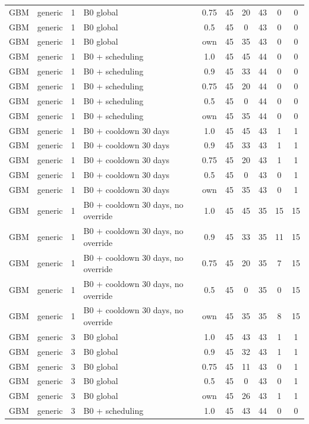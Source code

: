 \documentclass[10pt,onecolumn,letterpaper]{article}
\begin{document}
\begin{longtable}{lllp{4.4cm}cccccc}
GBM & generic & 1 & B0 global & 0.75 & 45 & 20 & 43 & 0 & 0 \\
GBM & generic & 1 & B0 global & 0.5 & 45 & 0 & 43 & 0 & 0 \\
GBM & generic & 1 & B0 global & own & 45 & 35 & 43 & 0 & 0 \\
GBM & generic & 1 & B0 + scheduling & 1.0 & 45 & 45 & 44 & 0 & 0 \\
GBM & generic & 1 & B0 + scheduling & 0.9 & 45 & 33 & 44 & 0 & 0 \\
GBM & generic & 1 & B0 + scheduling & 0.75 & 45 & 20 & 44 & 0 & 0 \\
GBM & generic & 1 & B0 + scheduling & 0.5 & 45 & 0 & 44 & 0 & 0 \\
GBM & generic & 1 & B0 + scheduling & own & 45 & 35 & 44 & 0 & 0 \\
GBM & generic & 1 & B0 + cooldown 30 days & 1.0 & 45 & 45 & 43 & 1 & 1 \\
GBM & generic & 1 & B0 + cooldown 30 days & 0.9 & 45 & 33 & 43 & 1 & 1 \\
GBM & generic & 1 & B0 + cooldown 30 days & 0.75 & 45 & 20 & 43 & 1 & 1 \\
GBM & generic & 1 & B0 + cooldown 30 days & 0.5 & 45 & 0 & 43 & 0 & 1 \\
GBM & generic & 1 & B0 + cooldown 30 days & own & 45 & 35 & 43 & 0 & 1 \\
GBM & generic & 1 & B0 + cooldown 30 days, no override & 1.0 & 45 & 45 & 35 & 15 & 15 \\
GBM & generic & 1 & B0 + cooldown 30 days, no override & 0.9 & 45 & 33 & 35 & 11 & 15 \\
GBM & generic & 1 & B0 + cooldown 30 days, no override & 0.75 & 45 & 20 & 35 & 7 & 15 \\
GBM & generic & 1 & B0 + cooldown 30 days, no override & 0.5 & 45 & 0 & 35 & 0 & 15 \\
GBM & generic & 1 & B0 + cooldown 30 days, no override & own & 45 & 35 & 35 & 8 & 15 \\
GBM & generic & 3 & B0 global & 1.0 & 45 & 43 & 43 & 1 & 1 \\
GBM & generic & 3 & B0 global & 0.9 & 45 & 32 & 43 & 1 & 1 \\
GBM & generic & 3 & B0 global & 0.75 & 45 & 11 & 43 & 0 & 1 \\
GBM & generic & 3 & B0 global & 0.5 & 45 & 0 & 43 & 0 & 1 \\
GBM & generic & 3 & B0 global & own & 45 & 26 & 43 & 1 & 1 \\
GBM & generic & 3 & B0 + scheduling & 1.0 & 45 & 43 & 44 & 0 & 0 \\

\end{longtable}
\end{document}

